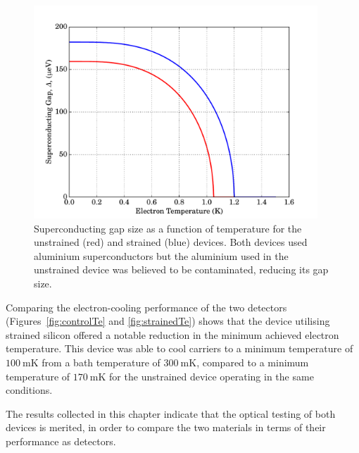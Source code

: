 \begin{figure}[tb]
\begin{center}
\includegraphics[width = 0.95\textwidth]{figures/SiCEB_deltaT}
\caption[Superconducting gap size as a function of temperature for the unstrained and strained devices]{Superconducting gap size as a function of temperature for the unstrained (red) and strained (blue) devices. Both devices used aluminium superconductors but the aluminium used in the unstrained device was believed to be contaminated, reducing its gap size.}
\label{fig:materialDelta}
\end{center}
\end{figure}
\par 
Comparing the electron-cooling performance of the two detectors (Figures~\ref{fig:controlTe} and \ref{fig:strainedTe}) shows that the device utilising strained silicon offered a notable reduction in the minimum achieved electron temperature. This device was able to cool carriers to a minimum temperature of $100~\mathrm{mK}$ from a bath temperature of $300~\mathrm{mK}$, compared to a minimum temperature of $170~\mathrm{mK}$ for the unstrained device operating in the same conditions. 
\par 
The results collected in this chapter indicate that the optical testing of both devices is merited, in order to compare the two materials in terms of their performance as detectors.

